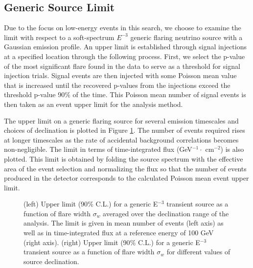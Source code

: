 \documentclass[manuscript]{aastex}
\begin{document}
\subsection{Generic Source Limit}
Due to the focus on low-energy events in this search, we choose to examine the limit with respect to a soft-spectrum $E^{-3}$ generic flaring neutrino source with a Gaussian emission profile. An upper limit is established through signal injections at a specified location through the following process. First, we select the p-value of the most significant flare found in the data to serve as a threshold for signal injection trials. Signal events are then injected with some Poisson mean value that is increased until the recovered p-values from the injections exceed the threshold p-value 90$\%$ of the time. This Poisson mean number of signal events is then taken as an event upper limit for the analysis method.

The upper limit on a generic flaring source for several emission timescales and choices of declination is plotted in Figure \ref{fig:GenericE3Limit}. The number of events required rises at longer timescales as the rate of accidental background correlations becomes non-negligible. The limit in terms of time-integrated flux (GeV$^{-1} \cdot$ cm$^{-2}$) is also plotted. This limit is obtained by folding the source spectrum with the effective area of the event selection and normalizing the flux so that the number of events produced in the detector corresponds to the calculated Poisson mean event upper limit. 

\begin{figure}[ht]
\caption[Time-integrated Flux Limit for E$^{-3}$ Source]{(left) Upper limit (90$\%$ C.L.) for a generic E$^{-3}$ transient source as a function of flare width $\sigma_w$ averaged over the declination range of the analysis. The limit is given in mean number of events (left axis) as well as in time-integrated flux at a reference energy of 100 GeV (right axis). (right) Upper limit (90$\%$ C.L.) for a generic E$^{-3}$ transient source as a function of flare width $\sigma_w$ for different values of source declination.}
\label{fig:GenericE3Limit}
\end{figure}
\end{document}
